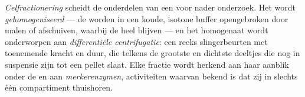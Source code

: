 \begin{definition}[Celfractionering]\label{def:b1:cell-unit-of-life:fractionation}
\emph{Celfractionering} scheidt de onderdelen van een 
voor nader onderzoek. Het  wordt
\emph{gehomogeniseerd} --- de  worden in een koude,
isotone buffer opengebroken door malen of afschuiven, waarbij de  heel
blijven --- en het homogenaat wordt onderworpen aan \emph{differentiële
centrifugatie}: een reeks slingerbeurten met
toenemende kracht en duur, die telkens de grootste en dichtste deeltjes die nog
in suspensie zijn tot een pellet slaat. Elke fractie wordt herkend aan haar
aanblik onder de  en aan
\emph{merkerenzymen}, activiteiten waarvan bekend is dat zij
in slechts één compartiment thuishoren.
\end{definition}

